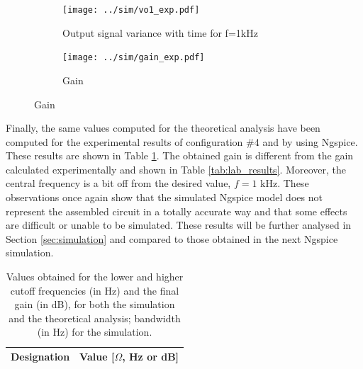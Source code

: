 \begin{figure}[H]
  \begin{subfigure}{.49\linewidth}
    \centering
    \texttt{[image: ../sim/vo1\_exp.pdf]}
    \footnotesize
  \caption{Output signal variance with time for f=1kHz}
   \label{fig:out1_exp}
  \end{subfigure}
  \hspace{5mm}
  \begin{subfigure}{.49\linewidth}
    \centering
  \texttt{[image: ../sim/gain\_exp.pdf]}
  \caption{Gain}
  \label{fig:out2_exp}
  \end{subfigure}
\end{figure}

Finally, the same values computed for the theoretical analysis have been computed for the experimental results of configuration $\#$4 and by using Ngspice. These results are shown in Table \ref{tab:rip_exp}. The obtained gain is different from the gain calculated experimentally and shown in Table \ref{tab:lab_results}. Moreover, the central frequency is a bit off from the desired value, $f=1$ kHz. These observations once again show that the simulated Ngspice model does not represent the assembled circuit in a totally accurate way and that some effects are difficult or unable to be simulated. These results will be further analysed in Section \ref{sec:simulation} and compared to those obtained in the next Ngspice simulation.

\begin{table}[H]
  \centering
  \begin{tabular}{|c|c|}
    \hline    
        {\bf Designation} & {\bf Value [$\Omega$, Hz or dB]} \\ \hline
        
        
  \end{tabular}
  \caption{Values obtained for the lower and higher cutoff frequencies (in Hz) and the final gain (in dB), for both the simulation and the theoretical analysis; bandwidth (in Hz) for the simulation.}
  \label{tab:rip_exp}
\end{table}
